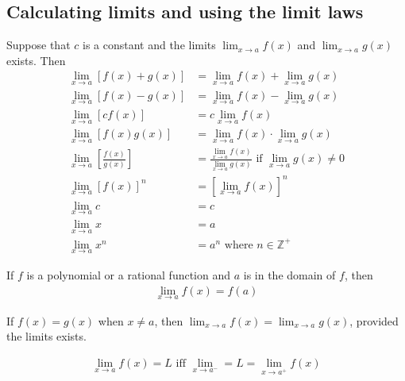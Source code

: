 \documentclass{article}
\begin{document}
\subsection{Calculating limits and using the limit laws}
\begin{theorem}
	Suppose that $c$ is a constant and the limits $\lim_{x\to a}f(x)$ and $\lim_{x\to a}g(x)$ exists. Then
	\begin{align*}
		\lim_{x\to a}\left[f(x)+g(x)\right]
		                  & =\lim_{x\to a}f(x)+\lim_{x\to a}g(x)                                              \\
		\lim_{x\to a}\left[f(x)-g(x)\right]
		                  & =\lim_{x\to a}f(x)-\lim_{x\to a}g(x)                                              \\
		\lim_{x\to a}\left[cf(x)\right]
		                  & =c\lim_{x\to a}f(x)                                                               \\
		\lim_{x\to a}\left[f(x)g(x)\right]
		                  & =\lim_{x\to a}f(x)\cdot\lim_{x\to a}g(x)                                          \\
		\lim_{x\to a}\left[\frac{f(x)}{g(x)}\right]
		                  & =\frac{\lim_{x\to a}f(x)}{\lim_{x\to a}g(x)}\text{ if } \lim_{x\to a}g(x)\not = 0 \\
		\lim_{x\to a}\left[f(x)\right]^n
		                  & =\left[\lim_{x\to a}f(x)\right]^n                                                 \\
		\lim_{x\to a}c    & = c                                                                               \\
		\lim_{x \to a}x   & = a                                                                               \\
		\lim_{x \to a}x^n & = a^n \text{ where } n\in\mathbb{Z}^+
	\end{align*}
\end{theorem}
\begin{theorem}
	If $f$ is a polynomial or a rational function and $a$ is in the domain of $f$, then
	\begin{align*}
		\lim_{x\to a}f(x) = f(a)
	\end{align*}
\end{theorem}
\begin{theorem}
	If $f(x) = g(x)$ when $x\not=a$, then $\lim_{x\to a}f(x) = \lim_{x\to a}g(x)$, provided the limits exists.
\end{theorem}
\begin{theorem}
	\begin{align*}
		\lim_{x\to a} f(x) = L\text{ iff } \lim_{x\to a^-}=L=\lim_{x\to a^+} f(x)
	\end{align*}
\end{theorem}
\end{document}
